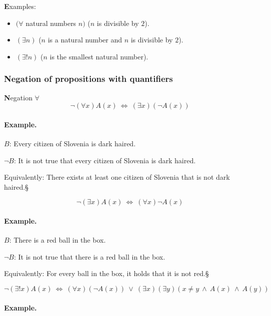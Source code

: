\documentclass[11pt,paper=b5,footinclude,headinclude]{scrbook} %
\def\ali {{~\vee~}}
\def\inn {{~\wedge~}}
\def\cee {{~\Leftrightarrow~}}
\def\kz{{\hfill{\S}}}%
\theoremstyle{remark}
\theoremstyle{definition} %
\begin{document}
\medskip
{\textbf Examples:}
\begin{itemize}
  \item
$(\forall$ natural numbers $n)$ ($n$ is divisible by $2$).
  \item
$(\exists n)$ ($n$ is a natural number and $n$ is divisible by $2$).
  \item
$(\exists !n)$ ($n$ is the smallest natural number).
\end{itemize}

\subsubsection{Negation of propositions with quantifiers}

{\textbf Negation $\forall$}
$$\neg (\forall x)A(x) \cee  (\exists x) (\neg A(x))$$

\medskip
\paragraph{Example.}

$B$: Every citizen of Slovenia is dark haired.

$\neg B$: It is not true that every citizen of Slovenia is dark haired.

Equivalently: There exists at least one citizen of Slovenia that is not dark haired.\kz

\medskip

$$\neg  (\exists x)A(x) \cee (\forall x) \neg A(x)$$

\medskip
\paragraph{Example.}

$B$: There is a red ball in the box.

$\neg B$: It is not true that there is a red ball in the box.

Equivalently: For every ball in the box, it holds that it is not red.\kz


\medskip

$$\neg (\exists ! x)A(x) \cee  (\forall x) (\neg A(x)) \ali (\exists x)(\exists y)(x\neq y\inn A(x) \inn A(y))$$

\medskip
\paragraph{Example.}
\end{document}
